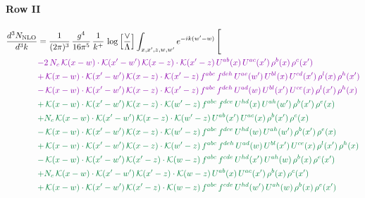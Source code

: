 \documentclass[10pt]{article}
\numberwithin{equation}{section}
\begin{document}
\paragraph{Row II}
\begin{align}
\frac{d^{3}N_{\mathrm{NLO}}}{d^{3}k} & = \frac{1}{(2\pi)^{3}}\,\frac{g^{4}}{16\pi^{5}}\,\frac{1}{k^{+}}\,\log\Big[\frac{\vee}{\Lambda}\Big]\int_{x,x',z,w,w'}e^{-ik(w'-w)}\,\Bigg[\notag\\ &{\color{CC}  -2\,N_{c}\,\mathcal{K}(x-w)\cdot\mathcal{K}(x'-w')\,\mathcal{K}(x-z)\cdot\mathcal{K}(x'-z)\,U^{ab}(x)\,U^{ac}(x')\,\rho^{b}(x)\,\rho^{c}(x')} \notag\\
&{\color{CC} +\,\mathcal{K}(x-w)\cdot\mathcal{K}(x'-w')\,\mathcal{K}(x-z)\cdot\mathcal{K}(x'-z)\,f^{abc}\,f^{deh}\,U^{ae}(w')\,U^{bl}(x)\,U^{cd}(x')\,\rho^{l}(x)\,\rho^{h}(x')} \notag\\
&{\color{CC} -\,\mathcal{K}(x-w)\cdot\mathcal{K}(x'-w')\,\mathcal{K}(x-z)\cdot\mathcal{K}(x'-z)\,f^{abc}\,f^{deh}\,U^{ad}(w)\,U^{bl}(x')\,U^{ce}(x)\,\rho^{l}(x')\,\rho^{h}(x)} \notag\\
&{\color{JIM} +\,\mathcal{K}(x-w)\cdot\mathcal{K}(x'-w')\,\mathcal{K}(x-z)\cdot\mathcal{K}(w'-z)\,f^{abc}\,f^{dce}\,U^{hd}(x)\,U^{ah}(w')\,\rho^{b}(x')\,\rho^{e}(x)} \notag\\
&{\color{JIM} +N_{c}\,\mathcal{K}(x-w)\cdot\mathcal{K}(x'-w')\,\mathcal{K}(x-z)\cdot\mathcal{K}(w'-z)\,U^{ab}(x')\,U^{ac}(x)\,\rho^{b}(x')\,\rho^{c}(x)} \notag\\
&{\color{JIM} -\,\mathcal{K}(x-w)\cdot\mathcal{K}(x'-w')\,\mathcal{K}(x-z)\cdot\mathcal{K}(w'-z)\,f^{abc}\,f^{dce}\,U^{hd}(w)\,U^{ah}(w')\,\rho^{b}(x')\,\rho^{e}(x)} \notag\\
&{\color{JIM} +\,\mathcal{K}(x-w)\cdot\mathcal{K}(x'-w')\,\mathcal{K}(x-z)\cdot\mathcal{K}(w'-z)\,f^{abc}\,f^{deh}\,U^{ad}(w)\,U^{bl}(x')\,U^{ce}(x)\,\rho^{l}(x')\,\rho^{h}(x)} \notag\\
&{\color{JIM} -\,\mathcal{K}(x-w)\cdot\mathcal{K}(x'-w')\,\mathcal{K}(x'-z)\cdot\mathcal{K}(w-z)\,f^{abc}\,f^{cde}\,U^{hd}(x')\,U^{ah}(w)\,\rho^{b}(x)\,\rho^{e}(x')} \notag\\
&{\color{JIM} +N_{c}\,\mathcal{K}(x-w)\cdot\mathcal{K}(x'-w')\,\mathcal{K}(x'-z)\cdot\mathcal{K}(w-z)\,U^{ab}(x)\,U^{ac}(x')\,\rho^{b}(x)\,\rho^{c}(x')} \notag\\
&{\color{JIM} +\,\mathcal{K}(x-w)\cdot\mathcal{K}(x'-w')\,\mathcal{K}(x'-z)\cdot\mathcal{K}(w-z)\,f^{abc}\,f^{cde}\,U^{hd}(w')\,U^{ah}(w)\,\rho^{b}(x)\,\rho^{e}(x')} \notag\\

\end{align}
\end{document}
